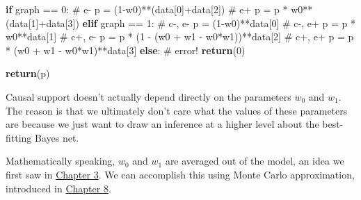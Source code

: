 \documentclass[
  letterpaper,
  DIV=11,
  numbers=noendperiod]{scrreprt}
\newenvironment{Shaded}{\begin{snugshade}}{\end{snugshade}}
\newcommand{\CommentTok}[1]{\textcolor[rgb]{0.37,0.37,0.37}{#1}}
\newcommand{\ControlFlowTok}[1]{\textcolor[rgb]{0.00,0.23,0.31}{\textbf{#1}}}
\newcommand{\DecValTok}[1]{\textcolor[rgb]{0.68,0.00,0.00}{#1}}
\newcommand{\NormalTok}[1]{\textcolor[rgb]{0.00,0.23,0.31}{#1}}
\newcommand{\OperatorTok}[1]{\textcolor[rgb]{0.37,0.37,0.37}{#1}}
\begin{document}
\begin{Shaded}
\begin{Highlighting}[]
  \ControlFlowTok{if}\NormalTok{ graph }\OperatorTok{==} \DecValTok{0}\NormalTok{:}
    \CommentTok{\# e{-}}
\NormalTok{    p }\OperatorTok{=}\NormalTok{ (}\DecValTok{1}\OperatorTok{{-}}\NormalTok{w0)}\OperatorTok{**}\NormalTok{(data[}\DecValTok{0}\NormalTok{]}\OperatorTok{+}\NormalTok{data[}\DecValTok{2}\NormalTok{])}
    \CommentTok{\# e+}
\NormalTok{    p }\OperatorTok{=}\NormalTok{ p }\OperatorTok{*}\NormalTok{ w0}\OperatorTok{**}\NormalTok{(data[}\DecValTok{1}\NormalTok{]}\OperatorTok{+}\NormalTok{data[}\DecValTok{3}\NormalTok{])}
  \ControlFlowTok{elif}\NormalTok{ graph }\OperatorTok{==} \DecValTok{1}\NormalTok{:}
    \CommentTok{\# c{-}, e{-}}
\NormalTok{    p }\OperatorTok{=}\NormalTok{ (}\DecValTok{1}\OperatorTok{{-}}\NormalTok{w0)}\OperatorTok{**}\NormalTok{data[}\DecValTok{0}\NormalTok{]}
    \CommentTok{\# c{-}, e+}
\NormalTok{    p }\OperatorTok{=}\NormalTok{ p }\OperatorTok{*}\NormalTok{ w0}\OperatorTok{**}\NormalTok{data[}\DecValTok{1}\NormalTok{]}
    \CommentTok{\# c+, e{-}}
\NormalTok{    p }\OperatorTok{=}\NormalTok{ p }\OperatorTok{*}\NormalTok{ (}\DecValTok{1} \OperatorTok{{-}}\NormalTok{ (w0 }\OperatorTok{+}\NormalTok{ w1 }\OperatorTok{{-}}\NormalTok{ w0}\OperatorTok{*}\NormalTok{w1))}\OperatorTok{**}\NormalTok{data[}\DecValTok{2}\NormalTok{]}
    \CommentTok{\# c+, e+}
\NormalTok{    p }\OperatorTok{=}\NormalTok{ p }\OperatorTok{*}\NormalTok{ (w0 }\OperatorTok{+}\NormalTok{ w1 }\OperatorTok{{-}}\NormalTok{ w0}\OperatorTok{*}\NormalTok{w1)}\OperatorTok{**}\NormalTok{data[}\DecValTok{3}\NormalTok{]}
  \ControlFlowTok{else}\NormalTok{:}
    \CommentTok{\# error!}
    \ControlFlowTok{return}\NormalTok{(}\DecValTok{0}\NormalTok{)}
  
  \ControlFlowTok{return}\NormalTok{(p)}
\end{Highlighting}
\end{Shaded}

Causal support doesn't actually depend directly on the parameters
\(w_0\) and \(w_1\). The reason is that we ultimately don't care what
the values of these parameters are because we just want to draw an
inference at a higher level about the best-fitting Bayes net.

Mathematically speaking, \(w_0\) and \(w_1\) are averaged out of the
model, an idea we first saw in \hyperref[generalizing]{Chapter 3}. We
can accomplish this using Monte Carlo approximation, introduced in
\hyperref[monte-carlo]{Chapter 8}.
\end{document}
